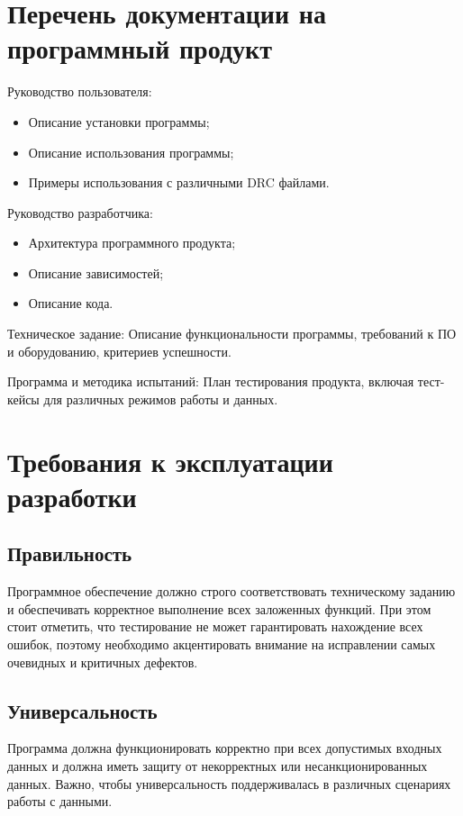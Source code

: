 \section{Перечень документации на программный продукт}

Руководство пользователя:

\begin{itemize}
	\item Описание установки программы;
	\item Описание использования программы;
	\item Примеры использования с различными DRC файлами.
\end{itemize}

Руководство разработчика:

\begin{itemize}
	\item Архитектура программного продукта;
	\item Описание зависимостей;
	\item Описание кода.
\end{itemize}

Техническое задание:
Описание функциональности программы, требований к ПО
и оборудованию, критериев успешности.

Программа и методика испытаний:
План тестирования продукта,
включая тест-кейсы для различных режимов работы и данных.

\section{Требования к эксплуатации разработки}

\subsection{Правильность}
Программное обеспечение должно строго соответствовать техническому заданию и обеспечивать корректное выполнение всех заложенных функций. При этом стоит отметить, что тестирование не может гарантировать нахождение всех ошибок, поэтому необходимо акцентировать внимание на исправлении самых очевидных и критичных дефектов.

\subsection{Универсальность}
Программа должна функционировать корректно при всех допустимых входных данных и должна иметь защиту от некорректных или несанкционированных данных. Важно, чтобы универсальность поддерживалась в различных сценариях работы с данными.

